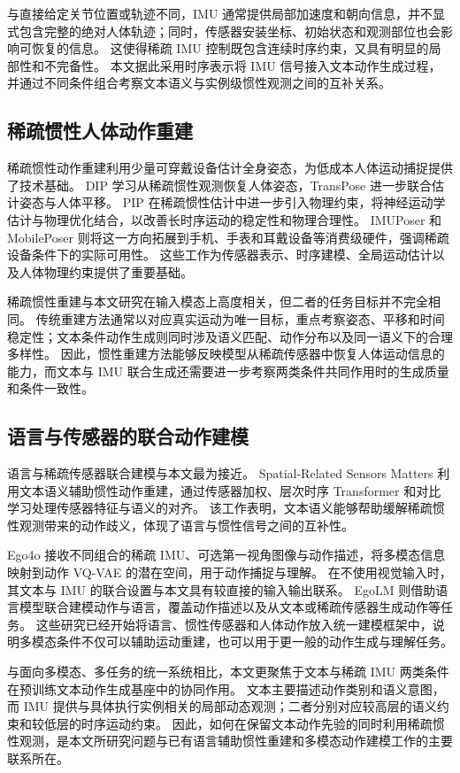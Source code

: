与直接给定关节位置或轨迹不同，IMU 通常提供局部加速度和朝向信息，并不显式包含完整的绝对人体轨迹；同时，传感器安装坐标、初始状态和观测部位也会影响可恢复的信息。
这使得稀疏 IMU 控制既包含连续时序约束，又具有明显的局部性和不完备性。
本文据此采用时序表示将 IMU 信号接入文本动作生成过程，并通过不同条件组合考察文本语义与实例级惯性观测之间的互补关系。

\subsection{稀疏惯性人体动作重建}

稀疏惯性动作重建利用少量可穿戴设备估计全身姿态，为低成本人体运动捕捉提供了技术基础。
DIP \cite{huang2018dip} 学习从稀疏惯性观测恢复人体姿态，TransPose \cite{yi2021transpose} 进一步联合估计姿态与人体平移。
PIP \cite{yi2022pip} 在稀疏惯性估计中进一步引入物理约束，将神经运动学估计与物理优化结合，以改善长时序运动的稳定性和物理合理性。
IMUPoser \cite{mollyn2023imuposer} 和 MobilePoser \cite{xu2024mobileposer} 则将这一方向拓展到手机、手表和耳戴设备等消费级硬件，强调稀疏设备条件下的实际可用性。
这些工作为传感器表示、时序建模、全局运动估计以及人体物理约束提供了重要基础。

稀疏惯性重建与本文研究在输入模态上高度相关，但二者的任务目标并不完全相同。
传统重建方法通常以对应真实运动为唯一目标，重点考察姿态、平移和时间稳定性；文本条件动作生成则同时涉及语义匹配、动作分布以及同一语义下的合理多样性。
因此，惯性重建方法能够反映模型从稀疏传感器中恢复人体运动信息的能力，而文本与 IMU 联合生成还需要进一步考察两类条件共同作用时的生成质量和条件一致性。

\subsection{语言与传感器的联合动作建模}

语言与稀疏传感器联合建模与本文最为接近。
Spatial-Related Sensors Matters \cite{yang2024spatialsensors} 利用文本语义辅助惯性动作重建，通过传感器加权、层次时序 Transformer 和对比学习处理传感器特征与语义的对齐。
该工作表明，文本语义能够帮助缓解稀疏惯性观测带来的动作歧义，体现了语言与惯性信号之间的互补性。

Ego4o \cite{wang2025ego4o} 接收不同组合的稀疏 IMU、可选第一视角图像与动作描述，将多模态信息映射到动作 VQ-VAE 的潜在空间，用于动作捕捉与理解。
在不使用视觉输入时，其文本与 IMU 的联合设置与本文具有较直接的输入输出联系。
EgoLM \cite{hong2025egolm} 则借助语言模型联合建模动作与语言，覆盖动作描述以及从文本或稀疏传感器生成动作等任务。
这些研究已经开始将语言、惯性传感器和人体动作放入统一建模框架中，说明多模态条件不仅可以辅助运动重建，也可以用于更一般的动作生成与理解任务。

与面向多模态、多任务的统一系统相比，本文更聚焦于文本与稀疏 IMU 两类条件在预训练文本动作生成基座中的协同作用。
文本主要描述动作类别和语义意图，而 IMU 提供与具体执行实例相关的局部动态观测；二者分别对应较高层的语义约束和较低层的时序运动约束。
因此，如何在保留文本动作先验的同时利用稀疏惯性观测，是本文所研究问题与已有语言辅助惯性重建和多模态动作建模工作的主要联系所在。
